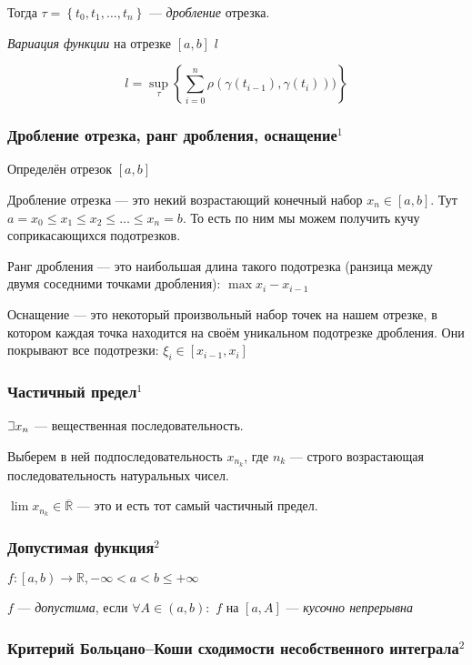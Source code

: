 \documentclass{article}
\def\letus{%
\mathord{\setbox0=\hbox{$\exists$}%
         \hbox{\kern 0.125\wd0%
               \vbox to \ht0{%
                  \hrule width 0.75\wd0%
                  \vfill%
                  \hrule width 0.75\wd0}%
               \vrule height \ht0%
               \kern 0.125\wd0}%
       }%
        }
\def\dbl{\,\,}
\begin{document}
Тогда $\tau = \left\{t_0, t_1, \ldots, t_n\right\}$ --- \textit{дробление} отрезка.

\textit{Вариация функции} на отрезке $\left[a, b\right] \dbl l$

\[l = \sup_\tau{\left\{\sum_{i = 0}^n{\rho(\gamma(t_{i - 1}), \gamma(t_i)))}\right\}}\]

\subsubsection{Дробление отрезка, ранг дробления, оснащение\texorpdfstring{$^1$}{}}
Определён отрезок $[a, b]$

Дробление отрезка --- это некий возрастающий конечный набор $x_n\in [a, b]$. Тут $a = x_0 \le x_1 \le x_2 \le \ldots \le x_n = b$.
То есть по ним мы можем получить кучу соприкасающихся подотрезков.

Ранг дробления --- это наибольшая длина такого подотрезка (ранзица между двумя соседними точками дробления): $\max x_i - x_{i-1}$

Оснащение --- это некоторый произвольный набор точек на нашем отрезке, в котором каждая точка находится на своём уникальном подотрезке дробления. Они покрывают все подотрезки: $\xi_i \in [x_{i-1}, x_i]$

\subsubsection{Частичный предел\texorpdfstring{$^1$}{}}
$\letus x_n$ --- вещественная последовательность.

Выберем в ней подпоследовательность $x_{n_k}$, где $n_k$ --- строго возрастающая последовательность натуральных чисел.

$\lim x_{n_k} \in \overline{\mathbb{R}}$ --- это и есть тот самый частичный предел.

\subsubsection{Допустимая функция\texorpdfstring{$^2$}{}}

$f: \left[a, b\right) \rightarrow \mathbb{R}, -\infty < a < b \le +\infty$

$f$ --- \textit{допустима}, если $\forall A \in \left(a, b\right):$ $f$ на $\left[a, A\right]$ --- \textit{кусочно непрерывна}

\subsubsection{Критерий Больцано--Коши сходимости несобственного интеграла\texorpdfstring{$^2$}{}}
\end{document}

